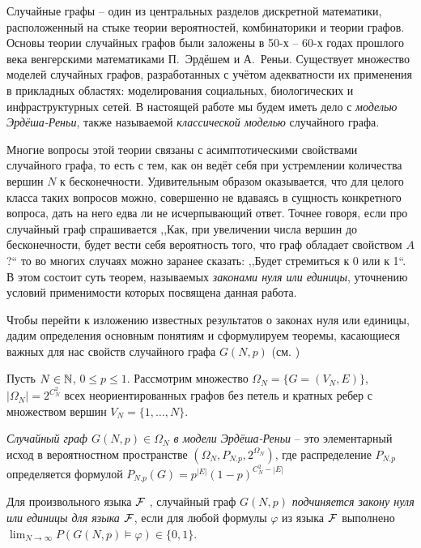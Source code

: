     Случайные графы -- один из центральных разделов дискретной математики, расположенный на стыке теории вероятностей, комбинаторики и теории графов.
    Основы теории случайных графов были заложены в 50-х -- 60-х годах прошлого века венгерскими математиками П.~Эрдёшем и А.~Реньи.
    Существует множество моделей случайных графов, разработанных с учётом адекватности их применения в прикладных областях: моделирования социальных, биологических и инфраструктурных сетей. 
    В настоящей работе мы будем иметь дело с \textit{моделью Эрдёша-Реньи}, также называемой \textit{классической моделью} случайного графа.
    
    Многие вопросы этой теории связаны с асимптотическими свойствами случайного графа, то есть с тем, как он ведёт себя при устремлении количества вершин $N$ к бесконечности.
    Удивительным образом оказывается, что для целого класса таких вопросов можно, совершенно не вдаваясь в сущность конкретного вопроса, дать на него едва ли не исчерпывающий ответ.
    Точнее говоря, если про случайный граф спрашивается ,,Как, при увеличении числа вершин до бесконечности, будет вести себя вероятность того, что граф обладает свойством $A$?`` то во многих случаях можно заранее сказать: ,,Будет стремиться к 0 или к 1``.
    В этом состоит суть теорем, называемых \textit{законами нуля или единицы}, уточнению условий применимости которых посвящена данная работа.
    
    Чтобы перейти к изложению известных результатов о законах нуля или единицы, дадим определения основным понятиям и сформулируем теоремы, касающиеся важных для нас свойств случайного графа $G(N,p)$ (см. \cite{survey2015})
    
    Пусть $N \in \mathbb {N}$, $0 \leq p \leq 1$. Рассмотрим множество $\Omega_N = \{G = (V_N , E)\}$, $|\Omega_N| = 2^{C_N^2}$ всех неориентированных графов без петель и кратных ребер с множеством вершин $V_N = \{1, \ldots, N \}$.
    
    \Def \textit{Случайный граф $G(N, p) \in \Omega_N$  в модели Эрдёша-Реньи} -- это элементарный исход в вероятностном пространстве $(\Omega_N, P_{N.p}, 2^{\Omega_N})$, где  распределение $P_{N.p}$ определяется формулой $P_{N.p}(G) = p^{|E|}(1-p)^{C_N^2-|E|}$
    
    \Def Для произвольного языка $\mathcal{F}$ , случайный граф $G(N, p)$ \textit{подчиняется закону нуля или единицы для языка $\mathcal{F}$},
    если для любой формулы $\varphi$ из языка 
    $\mathcal{F}$  выполнено
    $\lim_{N \rightarrow \infty} P(G(N, p) \vDash \varphi) \in \{0, 1\}$.
    
